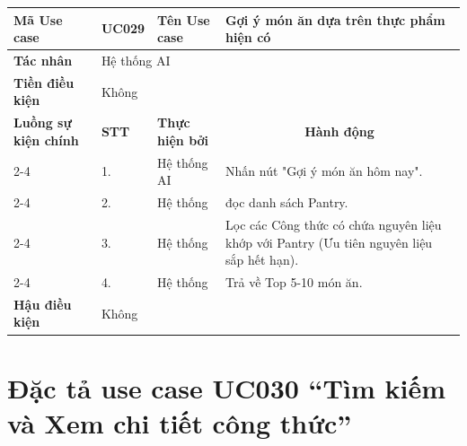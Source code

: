 \begin{longtable}{|p{2.7cm}|p{0.8cm}|p{2.6cm}|p{7.3cm}|}
\hline
\cellcolor[HTML]{D5F5E3}\textbf{Mã Use case} & \multicolumn{1}{l|}{UC029} & \cellcolor[HTML]{D5F5E3}\textbf{Tên Use case} & Gợi ý món ăn dựa trên thực phẩm hiện có \\ \hline
\cellcolor[HTML]{D5F5E3}\textbf{Tác nhân} & \multicolumn{3}{p{10.7cm}|}{Hệ thống AI} \\ \hline
\cellcolor[HTML]{D5F5E3}\textbf{Tiền điều kiện} & \multicolumn{3}{p{10.7cm}|}{Không} \\ \hline

\cellcolor[HTML]{D5F5E3}\textbf{Luồng sự kiện chính} & \cellcolor[HTML]{FDEBD0}\textbf{STT} & \cellcolor[HTML]{FDEBD0}\textbf{Thực hiện bởi} & \multicolumn{1}{c|}{\cellcolor[HTML]{FDEBD0}\textbf{Hành động}} \\ \cline{2-4} 
\cellcolor[HTML]{D5F5E3} & 1. & Hệ thống AI & Nhấn nút "Gợi ý món ăn hôm nay". \\ \cline{2-4} 
\cellcolor[HTML]{D5F5E3} & 2. & Hệ thống & đọc danh sách Pantry. \\ \cline{2-4} 
\cellcolor[HTML]{D5F5E3} & 3. & Hệ thống & Lọc các Công thức có chứa nguyên liệu khớp với Pantry (Ưu tiên nguyên liệu sắp hết hạn). \\ \cline{2-4} 
\cellcolor[HTML]{D5F5E3} & 4. & Hệ thống & Trả về Top 5-10 món ăn. \\ \hline

\cellcolor[HTML]{D5F5E3}\textbf{Hậu điều kiện} & \multicolumn{3}{p{10.7cm}|}{Không} \\ \hline
\end{longtable}
\endgroup

\section{Đặc tả use case UC030 ``Tìm kiếm và Xem chi tiết công thức''}
\vspace{0.5cm}

\begingroup
\renewcommand{\arraystretch}{1.5}

